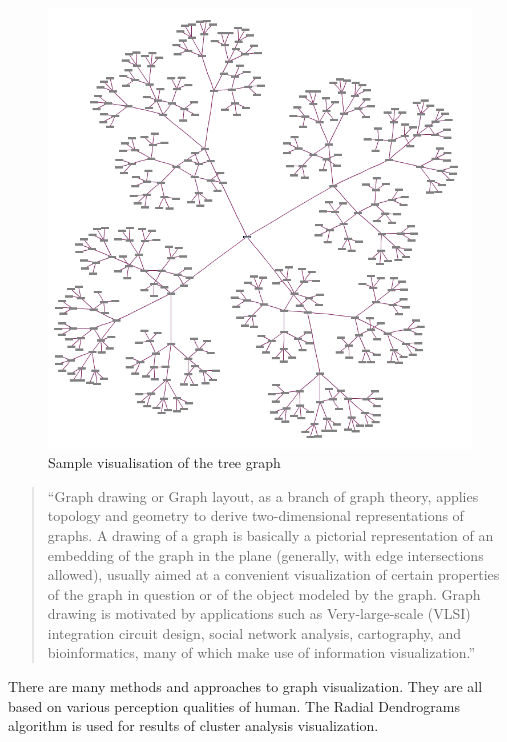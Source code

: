 \begin{figure}[h!]
\centering
\includegraphics[scale=0.3]{pictures/Tree_graph_example.png}
\caption{Sample visualisation of the tree graph}
\label{fig:tree_graph_example}
\end{figure}

\begin{quotation}
``Graph drawing or Graph layout, as a branch of graph theory, applies topology and geometry to derive two-dimensional representations of graphs.
A drawing of a graph is basically a pictorial representation of an embedding of the graph in the plane (generally, with edge intersections allowed),
usually aimed at a convenient visualization of certain properties of the graph in question or of the object modeled by the graph.
Graph drawing is motivated by applications such as Very-large-scale (VLSI)~\cite{VLSI} integration circuit design, social network analysis,
cartography, and bioinformatics, many of which make use of information visualization.''~\cite{Graph_drawing}
\end{quotation}

There are many methods and approaches to graph visualization. They are all based on various perception qualities of human.
The Radial Dendrograms~\cite{Radial_dendrogram} algorithm is used for results of cluster analysis visualization.

